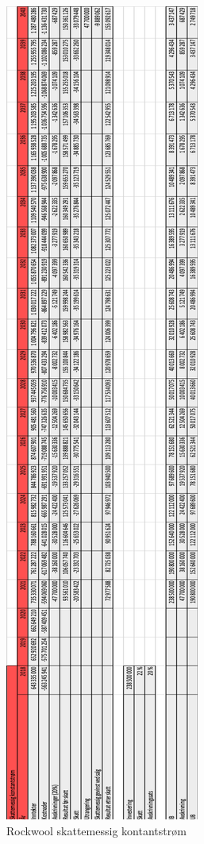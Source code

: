 \begin{figure}[H]
\centering
\includegraphics [scale=0.8]{appendiks/bilder/skattemessig.png}
\caption{Rockwool skattemessig kontantstrøm}
\label{fig:skattemessig}
\end{figure}